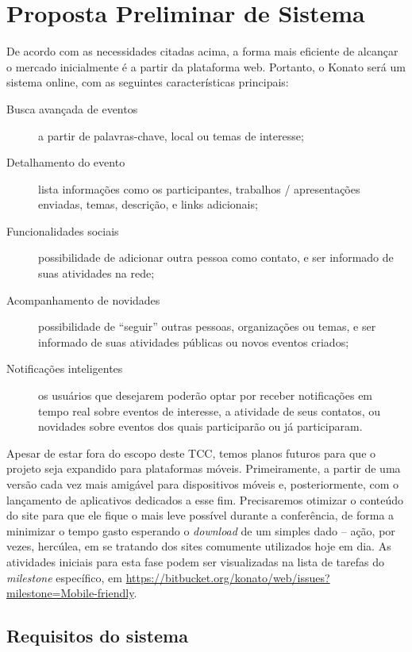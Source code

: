 \documentclass[12pt,a4paper,twoside,hyphens,english,brazil]{abntex2}
\begin{document}
\chapter{Proposta Preliminar de Sistema}
De acordo com as necessidades citadas acima, a forma mais eficiente de alcançar o mercado inicialmente é a partir da plataforma web. Portanto, o Konato será um sistema online, com as seguintes características principais:

\begin{description}
	\item[Busca avançada de eventos] a partir de palavras-chave, local ou temas de interesse;
	\item[Detalhamento do evento] lista informações como os participantes, trabalhos / apresentações enviadas, temas, descrição, e links adicionais;
	\item[Funcionalidades sociais] possibilidade de adicionar outra pessoa como contato, e ser informado de suas atividades na rede;
	\item[Acompanhamento de novidades] possibilidade de ``seguir'' outras pessoas, organizações ou temas, e ser informado de suas atividades públicas ou novos eventos criados;
	\item[Notificações inteligentes] os usuários que desejarem poderão optar por receber notificações em tempo real sobre eventos de interesse, a atividade de seus contatos, ou novidades sobre eventos dos quais participarão ou já participaram.
\end{description}

Apesar de estar fora do escopo deste TCC, temos planos futuros para que o projeto seja expandido para plataformas móveis. Primeiramente, a partir de uma versão cada vez mais amigável para dispositivos móveis e, posteriormente, com o lançamento de aplicativos dedicados a esse fim. Precisaremos otimizar o conteúdo do site para que ele fique o mais leve possível durante a conferência, de forma a minimizar o tempo gasto esperando o \emph{download} de um simples dado -- ação, por vezes, hercúlea, em se tratando dos sites comumente utilizados hoje em dia. As atividades iniciais para esta fase podem ser visualizadas na lista de tarefas do \emph{milestone} específico, em \mbox{\url{https://bitbucket.org/konato/web/issues?milestone=Mobile-friendly}}.

\section{Requisitos do sistema} \label{sec:requisitos}
\end{document}
